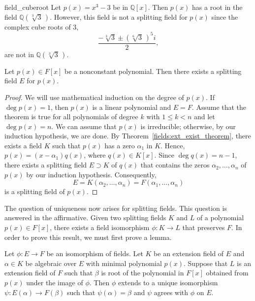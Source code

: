\begin{example}{field_cuberoot}
Let $p(x) = x^3 -3$ be in ${\mathbb Q}[x]$. Then $p(x)$ has a root in
the field ${\mathbb Q}( \sqrt[3]{3}\, )$.  However, this field is not a
splitting field for $p(x)$ since the complex cube roots of 3,
\[
\frac{-\sqrt[3]{3} \pm (\sqrt[6]{3}\, )^5 i }{2},
\]
are not 
in ${\mathbb Q}( \sqrt[3]{3}\, )$.
\end{example}
 
 
\begin{theorem}
Let $p(x) \in F[x]$ be a nonconstant polynomial. Then there exists a
splitting field $E$ for $p(x)$.
\end{theorem}
 

\begin{proof}
We will use mathematical induction on the degree of $p(x)$.  If $\deg
p(x) = 1$, then $p(x)$ is a linear polynomial and $E= F$.  Assume that
the theorem is true for all polynomials of degree $k$ with $1 \leq k <
n$ and let $\deg p(x) = n$. We can assume that $p(x)$ is irreducible;
otherwise, by our induction hypothesis, we are done. By Theorem~\ref{fields:ext_exist_theorem},
there exists a field $K$ such that $p(x)$ has a zero $\alpha_1$ in
$K$. Hence, $p(x) = (x - \alpha_1)q(x)$, where $q(x) \in K[x]$. Since
$\deg q(x) = n -1$, there exists a splitting field $E \supset K$ of
$q(x)$ that contains the zeros $\alpha_2, \ldots, \alpha_n$ of $p(x)$
by our induction hypothesis. Consequently,   
\[
E = K(\alpha_2, \ldots, \alpha_n) = F(\alpha_1, \ldots, \alpha_n)
\]
is a splitting field of $p(x)$.
\end{proof}


\medskip

The question of uniqueness now arises for splitting fields. This
question is answered in the affirmative. Given two splitting fields
$K$ and $L$ of a polynomial $p(x) \in F[x]$, there exists a field
isomorphism $\phi : K \rightarrow L$ that preserves $F$. In order to
prove this result, we must first prove a lemma. 

\medskip

\begin{lemma}\label{fields:isomorph_lemma}
Let $\phi : E \rightarrow F$ be an isomorphism of fields. Let $K$ be
an extension field of $E$ and $\alpha \in K$ be algebraic over $E$
with minimal polynomial $p(x)$. Suppose that $L$ is an extension field
of $F$ such that $\beta$ is root of the polynomial in $F[x]$ obtained
from $p(x)$ under the image of $\phi$.  Then $\phi$ extends to a unique
isomorphism $\psi : E( \alpha ) \rightarrow F( \beta )$ such that
$\psi( \alpha ) = \beta$ and $\psi$ agrees with $\phi$ on $E$.  
\end{lemma}

